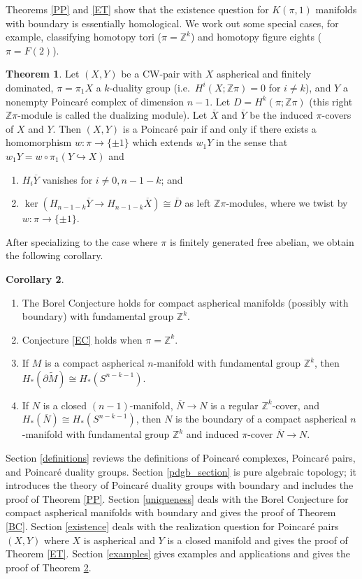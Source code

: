 \documentclass[12pt]{amsart}
\theoremstyle{definition}
\newtheorem{maintheorem}{Theorem}
\newtheorem{maincorollary}[maintheorem]{Corollary}
\newcommand{\Z}{\mathbb Z}
\newcommand{\ol}[1]{{\overline{#1}}}
\newcommand{\wt}[1]{{\widetilde{#1}}}
\begin{document}
Theorems \ref{PP} and \ref{ET} show that the existence question for $K(\pi,1)$ manifolds with boundary is essentially homological.  We work out some special cases, for example, classifying homotopy tori ($\pi= \Z^k$) and homotopy figure eights ($\pi= F(2)$).

\begin{maintheorem} \label{duality}
 Let $(X,Y)$ be a  CW-pair with $X$ aspherical and finitely dominated, $\pi = \pi_1X$ a $k$-duality group (i.e.~$H^i(X;\Z\pi) = 0$ for $i \not = k$), and $Y$ a nonempty Poincar\'e complex of dimension $n-1$.  Let $D = H^k(\pi;\Z\pi)$ (this right $\Z\pi$-module is called the dualizing module).  Let $\ol X$ and $\ol Y$ be the induced $\pi$-covers of $X$ and $Y$.   Then $(X,Y)$ is a Poincar\'e pair if and only if there exists a homomorphism $w : \pi \to \{\pm 1\}$ which extends $w_1Y$ in the sense that $w_1Y = w \circ \pi_1(Y \hookrightarrow X)$ and  \begin{enumerate}
 \item $H_i\ol Y $ vanishes for $i \not = 0,n-1-k$; and 
 \item  $\ker (H_{n-1-k} \ol Y  \to H_{n-1-k} \ol X) \cong \ol D$ as left $\Z\pi$-modules, where we twist by $w: \pi \to \{\pm 1\}$.  
\end{enumerate}
\end{maintheorem}

After specializing to  the case where $\pi$ is finitely generated free abelian, we obtain the following corollary.

\begin{maincorollary} \label{abelian}
\begin{enumerate}
\item The Borel Conjecture holds for compact aspherical manifolds (possibly with boundary) with fundamental group $\Z^k$.
 \item Conjecture \ref{EC} holds when $\pi = \Z^k$.
 \item If $M$ is a compact aspherical $n$-manifold with fundamental group $\Z^k$, then $H_*(\partial \wt M) \cong H_*(S^{n-k-1})$.
 \item If $N$ is a closed $(n-1)$-manifold, $\ol N \to N$ is a regular $\Z^k$-cover, and $H_*(\ol N) \cong H_*(S^{n-k-1})$, then $N$ is the boundary of a compact aspherical $n$-manifold with fundamental group $\Z^k$ and induced $\pi$-cover $\ol N \to N$.
\end{enumerate}
\end{maincorollary}


Section \ref{definitions} reviews the definitions of Poincar\'e complexes,  Poincar\'e pairs, and Poincar\'e duality groups.     Section \ref{pdgb_section} is pure algebraic topology; it introduces the theory of Poincar\'e duality groups with boundary and includes the proof of Theorem \ref{PP}.    Section \ref{uniqueness} deals with the  Borel Conjecture for compact aspherical manifolds with boundary and gives the proof of Theorem \ref{BC}.   Section \ref{existence}  deals with the realization question for Poincar\'e pairs $(X,Y)$ where $X$ is aspherical and $Y$ is a closed manifold and gives the proof of Theorem \ref{ET}.  Section \ref{examples} gives examples and applications and gives the proof of Theorem \ref{abelian}.
\end{document}
